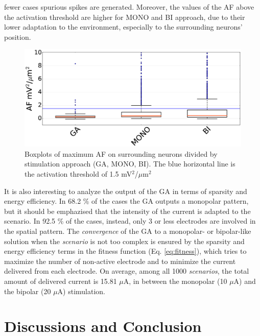 \documentclass[conference]{IEEEtran}
\begin{document}
fewer cases spurious spikes are generated.
Moreover, the values of the AF above the activation threshold  are higher
for MONO and BI approach, due to their lower adaptation to the environment,
especially to the surrounding neurons' position. \\
\begin{figure}[b]
\begin{centering}
\includegraphics[width=\linewidth]{figure_3_crop.eps}
\par\end{centering}

\caption{\label{fig:ga_mono_bi}Boxplots of maximum AF on surrounding neurons
divided by stimulation approach (GA, MONO, BI). The blue horizontal
line is the activation threshold of 1.5 mV$^{2}$/$\mu$m$^{2}$}


\end{figure}
It is also interesting to analyze the output of the GA in terms of
sparsity and energy efficiency. In 68.2 \% of the cases the GA outputs
a monopolar pattern, but it should be emphazised that the intensity
of the current is adapted to the scenario. In 92.5 \% of the cases,
instead, only 3 or less electrodes are involved in the spatial pattern.
The \emph{convergence} of the GA to a monopolar- or bipolar-like solution
when the \emph{scenario} is not too complex is ensured by the sparsity
and energy efficiency terms in the fitness function (Eq. \ref{eq:fitness}),
which tries to maximize the number of non-active electrode and to
minimize the current delivered from each electrode. On average, among
all 1000 \emph{scenarios}, the total amount of delivered current is
15.81 $\mu$A, in between the monopolar (10 $\mu$A)
and the bipolar (20 $\mu$A) stimulation. 


\section{Discussions and Conclusion\label{sec:Discussions-and-Conclusion}}
\end{document}
